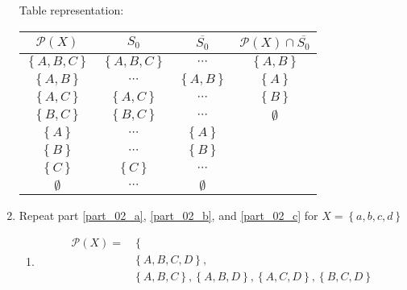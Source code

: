 \documentclass{article}
\begin{document}
\begin{enumerate}[label = \textbf{\alph*)}]
	      Table representation: \\
	      \begin{tabular}{ | c | c | c | c | }
		      $ \mathcal{P}(X) $           & $ S_0 $                      & $ \overline{S_0} $        & $ \mathcal{P}(X) \cap \overline{S_0} $ \\
		      \hline
		      $ \left\{ A, B, C \right\} $ & $ \left\{ A, B, C \right\} $ & $ \cdots $                & $ \left\{ A, B \right\} $              \\
		      $ \left\{ A, B \right\} $    & $ \cdots $                   & $ \left\{ A, B \right\} $ & $ \left\{ A \right\} $                 \\
		      $ \left\{ A, C \right\} $    & $ \left\{ A, C \right\} $    & $ \cdots $                & $ \left\{ B \right\} $                 \\
		      $ \left\{ B, C \right\} $    & $ \left\{ B, C \right\} $    & $ \cdots $                & $ \emptyset $                          \\
		      $ \left\{ A \right\} $       & $ \cdots $                   & $ \left\{ A \right\} $    &                                        \\
		      $ \left\{ B	\right\} $       & $ \cdots $                   & $ \left\{ B \right\} $    &                                        \\
		      $ \left\{ C	\right\} $       & $ \left\{ C \right\} $       & $ \cdots $                &                                        \\
		      $ \emptyset $                & $ \cdots $                   & $ \emptyset $             &
	      \end{tabular}
	\item Repeat part \ref{part_02_a}, \ref{part_02_b}, and \ref{part_02_c} for $ X = \left\{ a, b, c, d \right\} $
	      \begin{enumerate}[label = \textbf{\alph*)}]
		      \item
		            \begin{align*}
			            \mathcal{P}(X) = & \left\{ \right.                                                                                                                          \\
			                             & \left\{ A, B, C, D \right\},                                                                                                             \\
			                             & \left\{ A, B, C \right\}, \left\{ A, B, D \right\}, \left\{ A, C, D \right\}, \left\{ B, C, D \right\}                                   \\

\end{align*}
\end{enumerate}
\end{enumerate}
\end{document}
